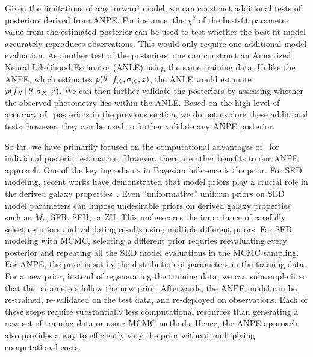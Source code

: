 Given the limitations of any forward model, we can construct additional tests
of posteriors derived from ANPE. 
For instance, the $\chi^2$ of the best-fit parameter value from the 
estimated posterior can be used to test whether the best-fit model 
accurately reproduces observations.
This would only require one additional model evaluation. 
As another test of the posteriors, one can construct an Amortized Neural
Likelihood Estimator (ANLE) using the same training data. 
Unlike the ANPE, which estimates $p(\theta\,|\, f_X, \sigma_X, z)$, the ANLE
would estimate $p(f_X \,|\, \theta, \sigma_X, z)$.
We can then further validate the posteriors by assessing whether the observed
photometry lies within the ANLE. 
Based on the high level of accuracy of \sedflow~posteriors in the previous
section, we do not explore these additional tests; however, they can be used to
further validate any ANPE posterior. 

So far, we have primarily focused on the computational advantages of
\sedflow~for individual posterior estimation. 
However, there are other benefits to our ANPE approach. 
One of the key ingredients in Bayesian inference is the prior. 
For SED modeling, recent works have demonstrated that model priors play a
crucial role in the derived galaxy properties~\citep{carnall2018, leja2019,
hahn2022}. 
Even ``uniformative'' uniform priors on SED model parameters can impose
undesirable priors on derived galaxy properties such as $M_*$, SFR, SFH, or
ZH.
This underscores the importance of carefully selecting priors and validating
results using multiple different priors. 
For SED modeling with MCMC, selecting a different prior requries reevaluating
every posterior and repeating all the SED model evaluations in the MCMC
sampling.  
For ANPE, the prior is set by the distribution of parameters in the training
data. 
For a new prior, instead of regenerating the training data, we can subsample
it so that the parameters follow the new prior. 
Afterwards, the ANPE model can be re-trained, re-validated on the test data,
and re-deployed on observations.
Each of these steps require substantially less computational resources than
generating a new set of training data or using MCMC methods. 
Hence, the ANPE approach also provides a way to efficiently vary the prior
without multiplying computational costs. 

